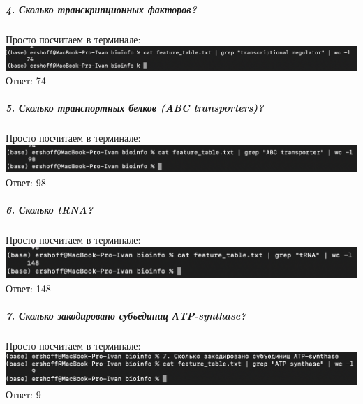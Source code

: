 \documentclass[12pt]{article}
\begin{document}
\subparagraph{4. Сколько транскрипционных факторов?\\}
Просто посчитаем в терминале:\\
\includegraphics[width=\textwidth]{image/image5.png}\\
Ответ: 74

\subparagraph{5. Сколько транспортных белков (ABC transporters)?\\}
Просто посчитаем в терминале:\\
\includegraphics[width=\textwidth]{image/image6.png}\\
Ответ: 98

\subparagraph{6. Сколько tRNA?\\}
Просто посчитаем в терминале:\\
\includegraphics[width=\textwidth]{image/image7.png}\\
Ответ: 148

\pagebreak
\subparagraph{7. Сколько закодировано субъединиц АTP-synthase?\\}
Просто посчитаем в терминале:\\
\includegraphics[width=\textwidth]{image/image8.png}\\
Ответ: 9
\end{document}

